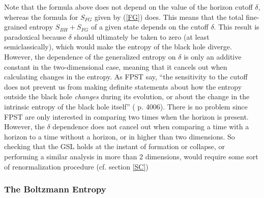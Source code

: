 \documentclass{article}
\begin{document}
Note that the formula above does not depend on the value of the horizon cutoff $\delta$, whereas the formula for $S_{FG}$ given by (\ref{FG}) does.  This means that the total fine-grained entropy $S_{BH} + S_{FG}$ of a given state depends on the cutoff $\delta$.  This result is paradoxical because $\delta$ should ultimately be taken to zero (at least semiclassically), which would make the entropy of the black hole diverge.  However, the dependence of the generalized entropy on $\delta$ is only an additive constant in the two-dimensional case, meaning that it cancels out when calculating changes in the entropy.  As FPST say, ``the sensitivity to the cutoff does not prevent us from making definite statements about how the entropy outside the black hole \emph{changes} during its evolution, or about the change in the intrinsic entropy of the black hole itself'' (\cite{fiola94} p. 4006).  There is no problem since FPST are only interested in comparing two times when the horizon is present.  However, the $\delta$ dependence does not cancel out when comparing a time with a horizon to a time without a horizon, or in higher than two dimensions.  So checking that the GSL holds at the instant of formation or collapse, or performing a similar analysis in more than 2 dimensions, would require some sort of renormalization procedure (cf. section \ref{SC})

\subsubsection{The Boltzmann Entropy}\label{Boltz}
\end{document}
